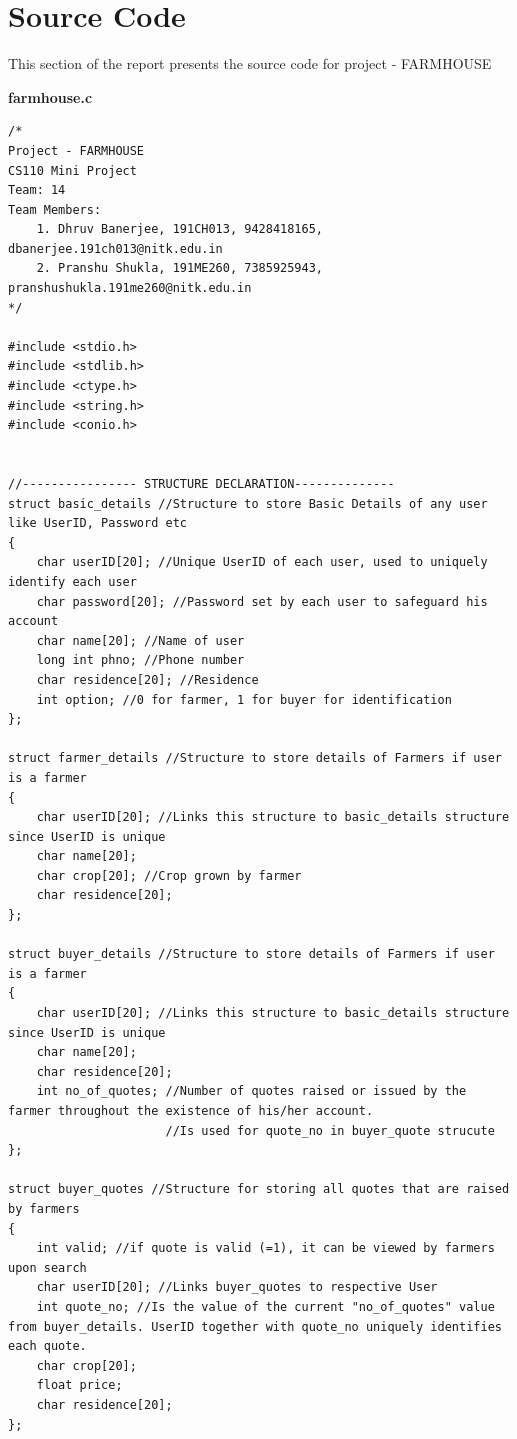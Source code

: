 \documentclass[12pt]{article}
\begin{document}


\newpage                            %
\section{Source Code}               %


This section of the report presents the source code for project - FARMHOUSE

\noindent \textbf{farmhouse.c}


\begin{lstlisting}
/*
Project - FARMHOUSE
CS110 Mini Project
Team: 14
Team Members:
    1. Dhruv Banerjee, 191CH013, 9428418165, dbanerjee.191ch013@nitk.edu.in
    2. Pranshu Shukla, 191ME260, 7385925943, pranshushukla.191me260@nitk.edu.in
*/

#include <stdio.h>
#include <stdlib.h>
#include <ctype.h>
#include <string.h>
#include <conio.h>


//---------------- STRUCTURE DECLARATION--------------
struct basic_details //Structure to store Basic Details of any user like UserID, Password etc
{
    char userID[20]; //Unique UserID of each user, used to uniquely identify each user
    char password[20]; //Password set by each user to safeguard his account
    char name[20]; //Name of user
    long int phno; //Phone number
    char residence[20]; //Residence
    int option; //0 for farmer, 1 for buyer for identification
};

struct farmer_details //Structure to store details of Farmers if user is a farmer
{
    char userID[20]; //Links this structure to basic_details structure since UserID is unique
    char name[20];
    char crop[20]; //Crop grown by farmer
    char residence[20];
};

struct buyer_details //Structure to store details of Farmers if user is a farmer
{
    char userID[20]; //Links this structure to basic_details structure since UserID is unique
    char name[20];
    char residence[20];
    int no_of_quotes; //Number of quotes raised or issued by the farmer throughout the existence of his/her account.
                      //Is used for quote_no in buyer_quote strucute
};

struct buyer_quotes //Structure for storing all quotes that are raised by farmers
{
    int valid; //if quote is valid (=1), it can be viewed by farmers upon search
    char userID[20]; //Links buyer_quotes to respective User
    int quote_no; //Is the value of the current "no_of_quotes" value from buyer_details. UserID together with quote_no uniquely identifies each quote.
    char crop[20];
    float price;
    char residence[20];
};


\end{lstlisting}
\end{document}
